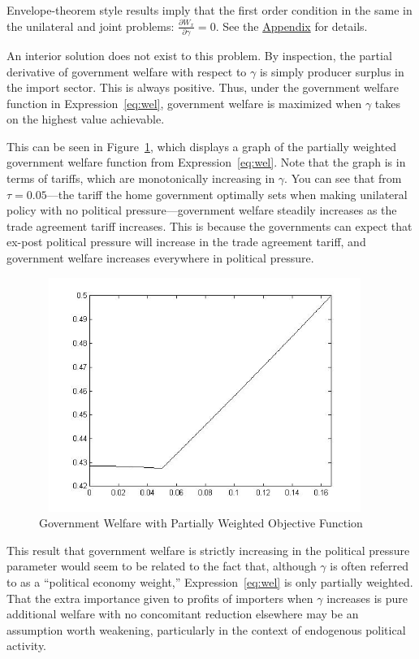 \documentclass[12pt]{article}
\newcommand{\ga}{\gamma}
\begin{document}
Envelope-theorem style results imply that the first order condition in the same in the unilateral and joint problems: $\displaystyle \frac{\partial W_x}{\partial \ga} = 0$. See the \hyperlink{envelope}{Appendix} for details.

An interior solution does not exist to this problem. By inspection, the partial derivative of government welfare with respect to $\ga$ is simply producer surplus in the import sector. This is always positive. Thus, under the government welfare function in Expression~\ref{eq:wel}, government welfare is maximized when $\ga$ takes on the highest value achievable.

This can be seen in Figure~\ref{fig:unweight}, which displays a graph of the partially weighted government welfare function from Expression~\ref{eq:wel}. Note that the graph is in terms of tariffs, which are monotonically increasing in $\ga$. You can see that from $\tau=0.05$---the tariff the home government optimally sets when making unilateral policy with no political pressure---government welfare steadily increases as the trade agreement tariff increases. This is because the governments can expect that ex-post political pressure will increase in the trade agreement tariff, and government welfare increases everywhere in political pressure.

\begin{figure}
\begin{center}
\includegraphics[height=3in, width=4.25in]{unweight.jpg}
\end{center}
\caption{Government Welfare with Partially Weighted Objective Function \label{fig:unweight}}
\end{figure}

This result that government welfare is strictly increasing in the political pressure parameter would seem to be related to the fact that, although $\ga$ is often referred to as a ``political economy weight,'' Expression~\ref{eq:wel} is only partially weighted. That the extra importance given to profits of importers when $\ga$ increases is pure additional welfare with no concomitant reduction elsewhere may be an assumption worth weakening, particularly in the context of endogenous political activity. 
\end{document}
